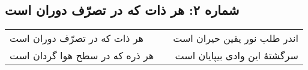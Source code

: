 \begin{center}
\section*{شماره ۲: هر ذات که در تصرّف دوران است}
\label{sec:002}
\begin{longtable}{l p{0.5cm} r}
هر ذات که در تصرّف دوران است
&&
اندر طلب نور یقین حیران است
\\
هر ذره که در سطح هوا گردان است
&&
سرگشتهٔ این وادی بیپایان است
\\
\end{longtable}
\end{center}
